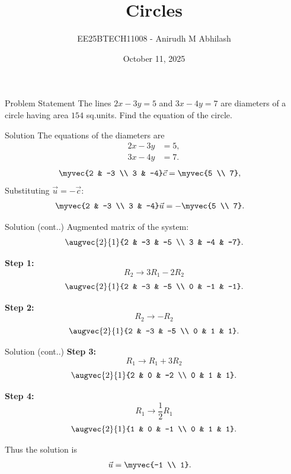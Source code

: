 \documentclass{beamer}
\title{Circles}
\author{EE25BTECH11008 - Anirudh M Abhilash}
\date{October 11, 2025}
\begin{document}
\begin{frame}
\titlepage
\end{frame}

\begin{frame}{Problem Statement}
The lines $2x - 3y = 5$ and $3x - 4y = 7$ are diameters of a circle having area $154$ sq.units. Find the equation of the circle.
\end{frame}

\begin{frame}{Solution}
The equations of the diameters are
\begin{align}
2x - 3y &= 5, \\
3x - 4y &= 7.
\end{align}
\begin{align}
\myvec{2 & -3 \\ 3 & -4}\vec{c} &= \myvec{5 \\ 7},
\end{align}
Substituting $\vec{u} = -\vec{c}$:
\begin{align}
\myvec{2 & -3 \\ 3 & -4}\vec{u} &= -\myvec{5 \\ 7}.
\end{align}
\end{frame}

\begin{frame}{Solution (cont..)}
Augmented matrix of the system:
\[
\augvec{2}{1}{2 & -3 & -5 \\ 3 & -4 & -7}.
\]

\textbf{Step 1:}
\[
R_2 \to 3R_1 - 2R_2
\]
\[
\augvec{2}{1}{2 & -3 & -5 \\ 0 & -1 & -1}.
\]

\textbf{Step 2:}
\[
R_2 \to -R_2
\]
\[
\augvec{2}{1}{2 & -3 & -5 \\ 0 & 1 & 1}.
\]
\end{frame}

\begin{frame}{Solution (cont..)}
\textbf{Step 3:}
\[
R_1 \to R_1 + 3R_2
\]
\[
\augvec{2}{1}{2 & 0 & -2 \\ 0 & 1 & 1}.
\]

\textbf{Step 4:}
\[
R_1 \to \frac{1}{2} R_1
\]
\[
\augvec{2}{1}{1 & 0 & -1 \\ 0 & 1 & 1}.
\]

Thus the solution is
\begin{align}
\vec{u} &= \myvec{-1 \\ 1}.
\end{align}
\end{frame}
\end{document}
